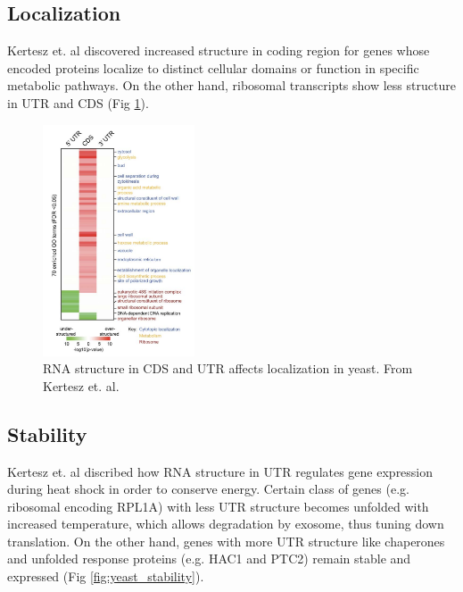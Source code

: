 \documentclass{proposal}
\begin{document}
\subsection*{Localization}

Kertesz et. al\cite{kertesz2010genome} discovered increased structure in coding region for genes
whose encoded proteins localize to distinct cellular domains or function in specific metabolic pathways.
On the other hand, ribosomal transcripts show less structure in UTR and CDS (Fig \ref{fig:yeast_localization}).



\begin{figure}[h!]
    \centering
    \includegraphics[width=0.4\textwidth]{yeast_localization.png}
    \caption{RNA structure in CDS and UTR affects localization in yeast. From Kertesz et. al\cite{kertesz2010genome}.}
    \label{fig:yeast_localization}
    \centering
\end{figure}



\subsection*{Stability}


Kertesz et. al\cite{kertesz2010genome} discribed how RNA structure in UTR regulates gene expression during heat shock in order to conserve energy.
Certain class of genes (e.g. ribosomal encoding ﻿RPL1A) with less UTR structure becomes unfolded with increased temperature,
which allows degradation by exosome, thus tuning down translation.
On the other hand, genes with more UTR structure like ﻿chaperones and unfolded response proteins (e.g. HAC1 and PTC2) remain stable and expressed (Fig \ref{fig:yeast_stability}).
\end{document}

